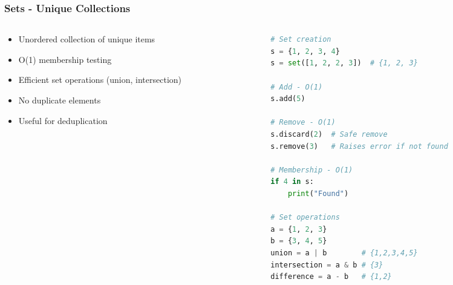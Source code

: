 \begin{frame}[fragile]\frametitle{Sets - Unique Collections}
\begin{columns}
    \begin{column}[T]{0.5\linewidth}
      \begin{itemize}
        \item Unordered collection of unique items
        \item O(1) membership testing
        \item Efficient set operations (union, intersection)
        \item No duplicate elements
        \item Useful for deduplication
      \end{itemize}
    \end{column}
    \begin{column}[T]{0.5\linewidth}
      \begin{lstlisting}[language=python, basicstyle=\tiny]
# Set creation
s = {1, 2, 3, 4}
s = set([1, 2, 2, 3])  # {1, 2, 3}

# Add - O(1)
s.add(5)

# Remove - O(1)
s.discard(2)  # Safe remove
s.remove(3)   # Raises error if not found

# Membership - O(1)
if 4 in s:
    print("Found")

# Set operations
a = {1, 2, 3}
b = {3, 4, 5}
union = a | b        # {1,2,3,4,5}
intersection = a & b # {3}
difference = a - b   # {1,2}
      \end{lstlisting}

    \end{column}
  \end{columns}
\end{frame}

